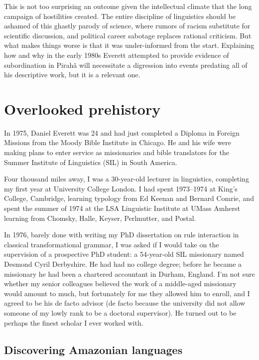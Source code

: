 \documentclass[output=paper,colorlinks,citecolor=brown
]{langscibook}
\begin{document}
This is not too surprising an outcome given the intellectual climate
that the long campaign of hostilities created. The entire discipline
of linguistics should be ashamed of this ghastly parody of science,
where rumors of racism substitute for scientific discussion, and
political career sabotage replaces rational criticism. But what makes
things worse is that it was under-informed from the start. Explaining
how and why in the early 1980s Everett attempted to provide evidence
of subordination in Pirahã will necessitate a digression into
events predating all of his descriptive work, but it is a relevant
one.

\section{Overlooked prehistory}\label{prehistory}

In 1975, Daniel Everett was 24 and had just completed a Diploma
in Foreign Missions from the Moody Bible Institute in Chicago. He and
his wife were making plans to enter service as missionaries and bible
translators for the Summer Institute of Linguistics (SIL) in South
America.

Four thousand miles away, I was a 30-year-old lecturer in linguistics,
completing my first year at University College London. I had spent
1973--1974 at King's College, Cambridge, learning typology from Ed
Keenan and Bernard Comrie, and spent the summer of 1974 at the LSA
Linguistic Institute at UMass Amherst learning from Chomsky, Halle,
Keyser, Perlmutter, and Postal.

In 1976, barely done with writing my PhD dissertation on rule interaction
in classical transformational grammar, I was asked if I would take
on the supervision of a prospective PhD student: a 54-year-old SIL
missionary named Desmond Cyril Derbyshire. He had had no college
degree; before he became a missionary he had been a chartered
accountant in Durham, England. I'm not sure whether my senior colleagues
believed the work of a middle-aged missionary would amount to much, but
fortunately for me they allowed him to enroll, and I agreed to be his
de facto advisor (de facto because the university did not allow someone
of my lowly rank to be a doctoral supervisor). He turned out to be
perhaps the finest scholar I ever worked with.

\subsection{Discovering Amazonian languages}
\label{sec-discovering-amazonian}
\end{document}
